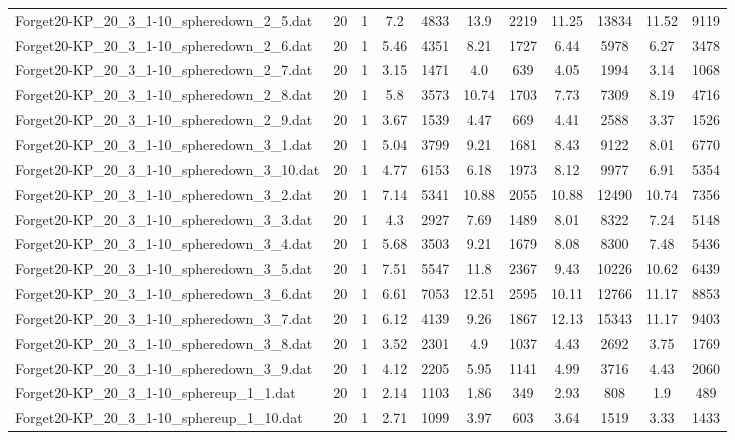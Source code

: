 \begin{table}[!ht]
\begin{tabular}{lcccccccccc}
Forget20-KP\_20\_3\_1-10\_spheredown\_2\_5.dat & 20 & 1 & 7.2 & 4833 & 13.9 & 2219 & 11.25 & 13834 & 11.52 & 9119 \\
Forget20-KP\_20\_3\_1-10\_spheredown\_2\_6.dat & 20 & 1 & 5.46 & 4351 & 8.21 & 1727 & 6.44 & 5978 & 6.27 & 3478 \\
Forget20-KP\_20\_3\_1-10\_spheredown\_2\_7.dat & 20 & 1 & 3.15 & 1471 & 4.0 & 639 & 4.05 & 1994 & 3.14 & 1068 \\
Forget20-KP\_20\_3\_1-10\_spheredown\_2\_8.dat & 20 & 1 & 5.8 & 3573 & 10.74 & 1703 & 7.73 & 7309 & 8.19 & 4716 \\
Forget20-KP\_20\_3\_1-10\_spheredown\_2\_9.dat & 20 & 1 & 3.67 & 1539 & 4.47 & 669 & 4.41 & 2588 & 3.37 & 1526 \\
Forget20-KP\_20\_3\_1-10\_spheredown\_3\_1.dat & 20 & 1 & 5.04 & 3799 & 9.21 & 1681 & 8.43 & 9122 & 8.01 & 6770 \\
Forget20-KP\_20\_3\_1-10\_spheredown\_3\_10.dat & 20 & 1 & 4.77 & 6153 & 6.18 & 1973 & 8.12 & 9977 & 6.91 & 5354 \\
Forget20-KP\_20\_3\_1-10\_spheredown\_3\_2.dat & 20 & 1 & 7.14 & 5341 & 10.88 & 2055 & 10.88 & 12490 & 10.74 & 7356 \\
Forget20-KP\_20\_3\_1-10\_spheredown\_3\_3.dat & 20 & 1 & 4.3 & 2927 & 7.69 & 1489 & 8.01 & 8322 & 7.24 & 5148 \\
Forget20-KP\_20\_3\_1-10\_spheredown\_3\_4.dat & 20 & 1 & 5.68 & 3503 & 9.21 & 1679 & 8.08 & 8300 & 7.48 & 5436 \\
Forget20-KP\_20\_3\_1-10\_spheredown\_3\_5.dat & 20 & 1 & 7.51 & 5547 & 11.8 & 2367 & 9.43 & 10226 & 10.62 & 6439 \\
Forget20-KP\_20\_3\_1-10\_spheredown\_3\_6.dat & 20 & 1 & 6.61 & 7053 & 12.51 & 2595 & 10.11 & 12766 & 11.17 & 8853 \\
Forget20-KP\_20\_3\_1-10\_spheredown\_3\_7.dat & 20 & 1 & 6.12 & 4139 & 9.26 & 1867 & 12.13 & 15343 & 11.17 & 9403 \\
Forget20-KP\_20\_3\_1-10\_spheredown\_3\_8.dat & 20 & 1 & 3.52 & 2301 & 4.9 & 1037 & 4.43 & 2692 & 3.75 & 1769 \\
Forget20-KP\_20\_3\_1-10\_spheredown\_3\_9.dat & 20 & 1 & 4.12 & 2205 & 5.95 & 1141 & 4.99 & 3716 & 4.43 & 2060 \\
Forget20-KP\_20\_3\_1-10\_sphereup\_1\_1.dat & 20 & 1 & 2.14 & 1103 & 1.86 & 349 & 2.93 & 808 & 1.9 & 489 \\
Forget20-KP\_20\_3\_1-10\_sphereup\_1\_10.dat & 20 & 1 & 2.71 & 1099 & 3.97 & 603 & 3.64 & 1519 & 3.33 & 1433 \\

\end{tabular}
\end{table}
